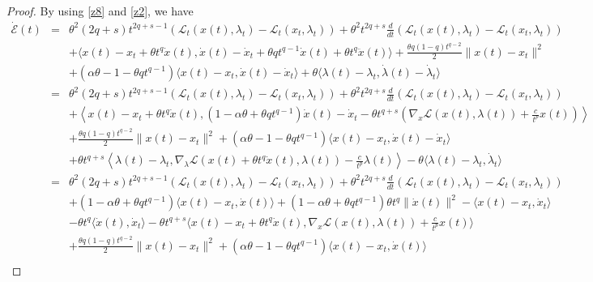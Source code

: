 \documentclass[review]{elsarticle}
\begin{document}
	\begin{proof}
		By using \eqref{z8} and \eqref{z2}, we have 
		\begin{eqnarray}\label{z6}
			\dot{\mathcal{E}}(t)&=&\theta^2(2q+s) t^{2q+s-1}\left(\mathcal{L}_{t}(x(t),\lambda_t)-\mathcal{L}_{t}(x_t,\lambda_t)\right)+\theta^2t^{2q+s}\frac{d}{dt}\left(\mathcal{L}_{t}(x(t),\lambda_t)-\mathcal{L}_{t}(x_t,\lambda_t)\right)\nonumber\\
			&&+\langle x(t)-x_t+\theta t^q\dot{x}(t), \dot{x}(t)-\dot{x}_t+\theta qt^{q-1}\dot{x}(t)+\theta t^q\ddot{x}(t)\rangle+\frac{\theta q(1-q)t^{q-2}}{2}\|x(t)-x_t\|^2\nonumber\\
			&&+(\alpha\theta-1-\theta q t^{q-1})\langle x(t)-x_t, \dot{x}(t)-\dot{x}_t\rangle+\theta\langle \lambda(t)-\lambda_t, \dot{\lambda}(t)-\dot{\lambda}_t \rangle\nonumber\\
			&=&\theta^2(2q+s) t^{2q+s-1}\left(\mathcal{L}_{t}(x(t),\lambda_t)-\mathcal{L}_{t}(x_t,\lambda_t)\right)+\theta^2t^{2q+s}\frac{d}{dt}\left(\mathcal{L}_{t}(x(t),\lambda_t)-\mathcal{L}_{t}(x_t,\lambda_t)\right)\nonumber\\
			&&+\left\langle x(t)-x_t+\theta t^q\dot{x}(t), (1-\alpha\theta+\theta qt^{q-1})\dot{x}(t)-\dot{x}_t-\theta t^{q+s}\left(\nabla_{x}\mathcal{L}(x(t), \lambda(t))+\frac{c}{t^p}x(t)\right)\right\rangle\nonumber\\
			&&+\frac{\theta q(1-q)t^{q-2}}{2}\|x(t)-x_t\|^2+(\alpha\theta-1-\theta q t^{q-1})\langle x(t)-x_t, \dot{x}(t)-\dot{x}_t\rangle\nonumber\\
			&&+\theta t^{q+s}\left\langle \lambda(t)-\lambda_t, \nabla_{\lambda}\mathcal{L}(x(t)+\theta t^q\dot{x}(t), \lambda(t))-\frac{c}{t^p}\lambda(t)\right\rangle-\theta\langle \lambda(t)-\lambda_t, \dot{\lambda}_t \rangle\nonumber\\
			&=&\theta^2(2q+s) t^{2q+s-1}\left(\mathcal{L}_{t}(x(t),\lambda_t)-\mathcal{L}_{t}(x_t,\lambda_t)\right)+\theta^2t^{2q+s}\frac{d}{dt}\left(\mathcal{L}_{t}(x(t),\lambda_t)-\mathcal{L}_{t}(x_t,\lambda_t)\right)\nonumber\\
			&&+(1-\alpha\theta+\theta qt^{q-1})\langle x(t)-x_t, \dot{x}(t)\rangle+(1-\alpha\theta+\theta qt^{q-1})\theta t^q\|\dot{x}(t)\|^2-\langle x(t)-x_t, \dot{x}_t\rangle\nonumber\\
			&&-\theta t^q\langle\dot{x}(t), \dot{x}_t\rangle-\theta t^{q+s}\langle x(t)-x_t+\theta t^q\dot{x}(t), \nabla_{x}\mathcal{L}(x(t), \lambda(t))+\frac{c}{t^p}x(t)\rangle\nonumber\\
			&&+\frac{\theta q(1-q)t^{q-2}}{2}\|x(t)-x_t\|^2+(\alpha\theta-1-\theta q t^{q-1})\langle x(t)-x_t, \dot{x}(t)\rangle\nonumber\\

\end{eqnarray}
\end{proof}
\end{document}

